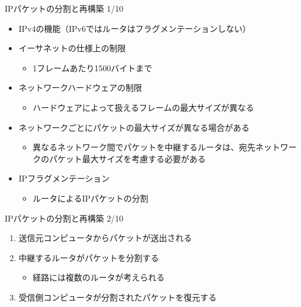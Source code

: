 \documentclass[12pt,aspectratio=169]{beamer}
\begin{document}
\begin{frame}{IPパケットの分割と再構築 1/10}

  \begin{itemize}
    \item IPv4の機能（IPv6ではルータはフラグメンテーションしない） %
    \item イーサネットの仕様上の制限
      \begin{itemize}
        \item 1フレームあたり1500バイトまで
      \end{itemize}

    \item ネットワークハードウェアの制限
      \begin{itemize}
        \item ハードウェアによって扱えるフレームの最大サイズが異なる %
      \end{itemize}

    \item ネットワークごとにパケットの最大サイズが異なる場合がある
      \begin{itemize}
        \item 異なるネットワーク間でパケットを中継するルータは、宛先ネットワークのパケット最大サイズを考慮する必要がある
      \end{itemize}

    \item IPフラグメンテーション
      \begin{itemize}
        \item ルータによるIPパケットの分割
      \end{itemize}

  \end{itemize}

\end{frame}


\begin{frame}{IPパケットの分割と再構築 2/10}

  \begin{enumerate}
    \item 送信元コンピュータからパケットが送出される
    \item 中継するルータがパケットを分割する
      \begin{itemize}
        \item 経路には複数のルータが考えられる
      \end{itemize}
    \item 受信側コンピュータが分割されたパケットを復元する

  \end{enumerate}

\end{frame}
\end{document}
